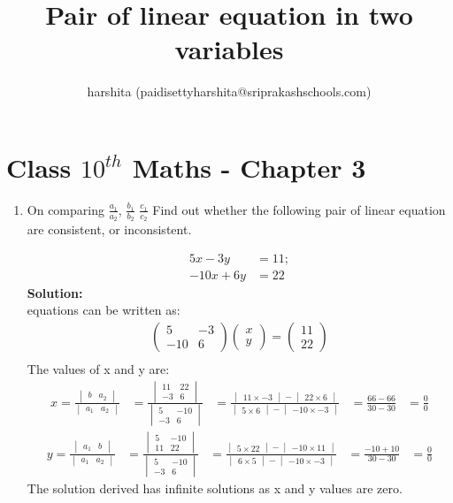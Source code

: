 \documentclass[12pt]{article}
\title{Pair of linear equation in two variables}
\author{harshita (paidisettyharshita@sriprakashschools.com)}
\newcommand{\myvec}[1]{\ensuremath{\begin{pmatrix}#1\end{pmatrix}}}
\newcommand{\mydet}[1]{\ensuremath{\begin{vmatrix}#1\end{vmatrix}}}
\newcommand{\solution}{\noindent \textbf{Solution: }}
\begin{document}
\maketitle
\section*{Class $10^{th}$ Maths - Chapter 3}

\begin{enumerate}
 \item On comparing $\frac{a_1}{a_2}$, $\frac{b_1}{b_2}$ $\frac{c_1}{c_2} $
Find out whether the following pair of linear equation are consistent, or inconsistent.

\begin{align}
5x-3y&=11;\\
-10x+6y&=22
\end{align}
 \solution \\
 equations can be written as:\\

\begin{align}
\myvec{5&-3\\-10&6} \myvec{x\\y} = \myvec{11\\22}\\
\end{align}
The values of x and y are:
\begin{align}
x=\frac{\mydet{b & a_2}}{\mydet {a_1 &a_2}} &=
\frac{\mydet{11&22 \\ -3&6}}{\mydet {5&-10 \\ -3&6}}&=\frac{\mydet{11\times-3}-\mydet{22\times6}}{\mydet{5\times6}-\mydet{-10\times-3}}
&=\frac{66-66}{30-30}&=\frac{0}{0}
\end{align}
\begin{align}
 y=\frac{\mydet{ a_1 & b}}{\mydet {a_1 & a_2}}&=
\frac{\mydet{5&-10\\11&22}}{\mydet{5&-10\\-3&6}}&=\frac{\mydet{5\times22}-\mydet{-10\times11}}{\mydet{6\times5}-\mydet{-10\times-3}}
&=\frac{-10+10}{30-30}&=\frac{0}{0}
\end{align}
The solution derived has infinite solutions as x and y values are zero.

\end{enumerate}
\end{document}
